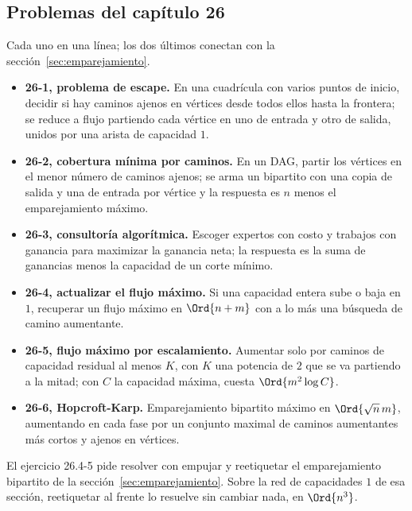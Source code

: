 \documentclass[11pt,letterpaper]{article}
\begin{document}
\subsection*{Problemas del capítulo 26}

Cada uno en una línea; los dos últimos conectan con la
sección~\ref{sec:emparejamiento}.
\begin{itemize}
  \item \textbf{26-1, problema de escape.} En una cuadrícula con varios
        puntos de inicio, decidir si hay caminos ajenos en vértices
        desde todos ellos hasta la frontera; se reduce a flujo
        partiendo cada vértice en uno de entrada y otro de salida,
        unidos por una arista de capacidad $1$.
  \item \textbf{26-2, cobertura mínima por caminos.} En un DAG, partir
        los vértices en el menor número de caminos ajenos; se arma un
        bipartito con una copia de salida y una de entrada por vértice
        y la respuesta es $n$ menos el emparejamiento máximo.
  \item \textbf{26-3, consultoría algorítmica.} Escoger expertos con
        costo y trabajos con ganancia para maximizar la ganancia neta;
        la respuesta es la suma de ganancias menos la capacidad de un
        corte mínimo.
  \item \textbf{26-4, actualizar el flujo máximo.} Si una capacidad
        entera sube o baja en $1$, recuperar un flujo máximo en
        $\Ord{n + m}$ con a lo más una búsqueda de camino aumentante.
  \item \textbf{26-5, flujo máximo por escalamiento.} Aumentar solo por
        caminos de capacidad residual al menos $K$, con $K$ una
        potencia de $2$ que se va partiendo a la mitad; con $C$ la
        capacidad máxima, cuesta $\Ord{m^2 \log C}$.
  \item \textbf{26-6, Hopcroft-Karp.} Emparejamiento bipartito máximo
        en $\Ord{\sqrt{n}\, m}$, aumentando en cada fase por un
        conjunto maximal de caminos aumentantes más cortos y ajenos en
        vértices.
\end{itemize}

El ejercicio 26.4-5 pide resolver con empujar y reetiquetar el
emparejamiento bipartito de la sección~\ref{sec:emparejamiento}. Sobre
la red de capacidades $1$ de esa sección, reetiquetar al frente lo
resuelve sin cambiar nada, en $\Ord{n^3}$.

\end{document}
